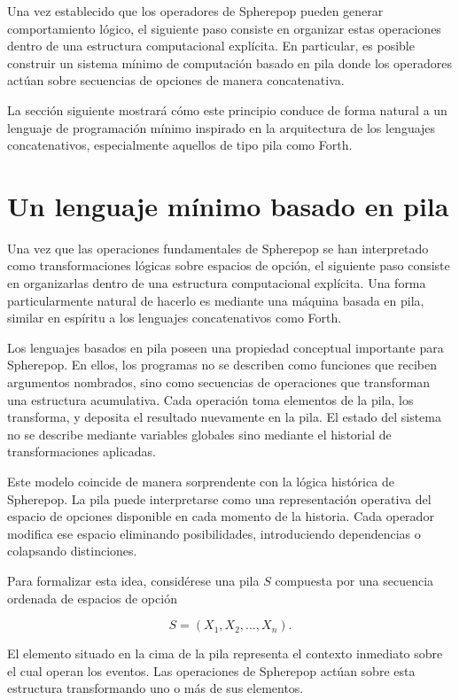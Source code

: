 \documentclass[12pt]{article}
\begin{document}
Una vez establecido que los operadores de Spherepop pueden generar comportamiento lógico, el siguiente paso consiste en organizar estas operaciones dentro de una estructura computacional explícita. En particular, es posible construir un sistema mínimo de computación basado en pila donde los operadores actúan sobre secuencias de opciones de manera concatenativa.

La sección siguiente mostrará cómo este principio conduce de forma natural a un lenguaje de programación mínimo inspirado en la arquitectura de los lenguajes concatenativos, especialmente aquellos de tipo pila como Forth.

\section{Un lenguaje mínimo basado en pila}

Una vez que las operaciones fundamentales de Spherepop se han interpretado como transformaciones lógicas sobre espacios de opción, el siguiente paso consiste en organizarlas dentro de una estructura computacional explícita. Una forma particularmente natural de hacerlo es mediante una máquina basada en pila, similar en espíritu a los lenguajes concatenativos como Forth.

Los lenguajes basados en pila poseen una propiedad conceptual importante para Spherepop. En ellos, los programas no se describen como funciones que reciben argumentos nombrados, sino como secuencias de operaciones que transforman una estructura acumulativa. Cada operación toma elementos de la pila, los transforma, y deposita el resultado nuevamente en la pila. El estado del sistema no se describe mediante variables globales sino mediante el historial de transformaciones aplicadas.

Este modelo coincide de manera sorprendente con la lógica histórica de Spherepop. La pila puede interpretarse como una representación operativa del espacio de opciones disponible en cada momento de la historia. Cada operador modifica ese espacio eliminando posibilidades, introduciendo dependencias o colapsando distinciones.

Para formalizar esta idea, considérese una pila \(S\) compuesta por una secuencia ordenada de espacios de opción

\[
S = (X_1, X_2, \dots, X_n).
\]

El elemento situado en la cima de la pila representa el contexto inmediato sobre el cual operan los eventos. Las operaciones de Spherepop actúan sobre esta estructura transformando uno o más de sus elementos.
\end{document}
